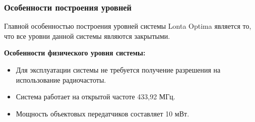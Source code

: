 \subsubsection{Особенности построения уровней}
Главной особенностью построения уровней системы  Lonta Optima является то, что все уровни данной системы являются закрытыми.

\textbf{Особенности физического уровня системы:}

\begin{itemize}
	
	\item Для эксплуатации системы не требуется получение разрешения на использование радиочастоты.
	\item Система работает на открытой частоте 433,92 МГц.
	\item Мощность объектовых передатчиков составляет 10 мВт\cite{3}.
	
\end{itemize}

\newpage